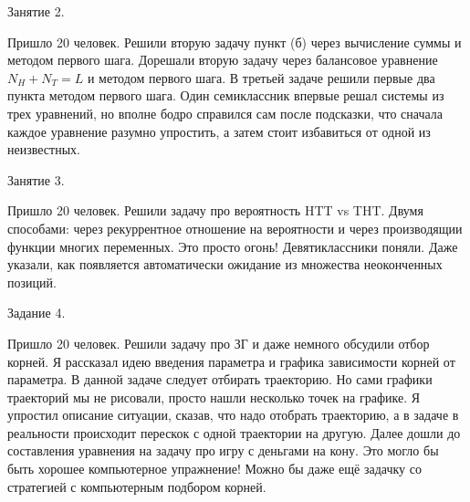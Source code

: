 \documentclass[12pt]{article}
\theoremstyle{definition}
\begin{document}
Занятие 2. 

Пришло 20 человек. 
Решили вторую задачу пункт (б) через вычисление суммы и методом первого шага.
Дорешали вторую задачу через балансовое уравнение $N_H + N_T = L$ и методом первого шага. 
В третьей задаче решили первые два пункта методом первого шага. 
Один семиклассник впервые решал системы из трех уравнений, 
но вполне бодро справился сам после подсказки, 
что сначала каждое уравнение разумно упростить, а затем стоит избавиться от одной из неизвестных. 

Занятие 3. 

Пришло 20 человек. 
Решили задачу про вероятность HTT vs THT. 
Двумя способами: через рекуррентное отношение на вероятности и через производящии функции многих переменных. 
Это просто огонь! Девятиклассники поняли. Даже указали, как появляется автоматически ожидание из множества неоконченных позиций. 

Задание 4. 

Пришло 20 человек. 
Решили задачу про ЗГ и даже немного обсудили отбор корней. 
Я рассказал идею введения параметра и графика зависимости корней от параметра. 
В данной задаче следует отбирать траекторию. 
Но сами графики траекторий мы не рисовали, просто нашли несколько точек на графике. 
Я упростил описание ситуации, сказав, что надо отобрать траекторию, 
а в задаче в реальности происходит перескок с одной траектории на другую. 
Далее дошли до составления уравнения на задачу про игру с деньгами на кону. 
Это могло бы быть хорошее компьютерное упражнение!
Можно бы даже ещё задачку со стратегией с компьютерным подбором корней. 
\end{document}
